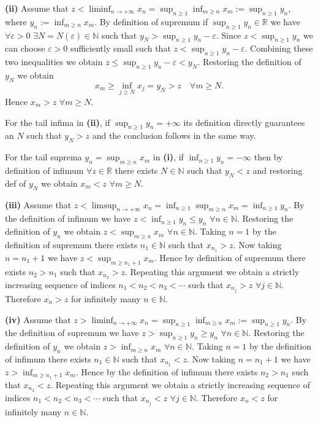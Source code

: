 \documentclass[11pt,a4paper]{article}
\newcommand{\studylabel}[1]{\textcolor{StudyBlue}{\textnormal{\bfseries #1}}}
\begin{document}
\studylabel{(ii)} Assume that $z<\liminf_{n\to+\infty}x_n=\sup_{n\ge1}\inf_{m\ge n}x_m:=\sup_{n\ge1}y_n$,
where $y_n:=\inf_{m\ge n}x_m$.
By definition of supremum if $\sup_{n\ge1}y_n\in\mathbb R$ we have $\forall\varepsilon>0$ $\exists N=N(\varepsilon)\in\mathbb N$ such that $y_N>\sup_{n\ge1}y_n-\varepsilon$.
Since $z<\sup_{n\ge1}y_n$ we can choose $\varepsilon>0$ sufficiently small such that $z<\sup_{n\ge1}y_n-\varepsilon$.
Combining these two inequalities we obtain $z\le\sup_{n\ge1}y_n-\varepsilon<y_N$.
Restoring the definition of $y_N$ we obtain
\[
x_m\ge\inf_{j\ge N}x_j=y_N>z\quad\forall m\ge N.
\]
Hence $x_m>z$ $\forall m\ge N$.

For the tail infima in \studylabel{(ii)}, if $\sup_{n\ge1}y_n=+\infty$ its definition directly guarantees an $N$ such that $y_N>z$ and the conclusion follows in the same way.

For the tail suprema $y_n=\sup_{m\ge n}x_m$ in \studylabel{(i)}, if $\inf_{n\ge1}y_n=-\infty$ then by definition of infimum $\forall z\in\mathbb R$ there exists $N\in\mathbb N$ such that $y_N<z$ and restoring def of $y_N$ we obtain $x_m<z$ $\forall m\ge N$.

\studylabel{(iii)} Assume that $z<\limsup_{n\to+\infty}x_n=\inf_{n\ge1}\sup_{m\ge n}x_m=\inf_{n\ge1}y_n$.
By the definition of infimum we have $z<\inf_{n\ge1}y_n\le y_n$ $\forall n\in\mathbb N$.
Restoring the definition of $y_n$ we obtain $z<\sup_{m\ge n}x_m$ $\forall n\in\mathbb N$.
Taking $n=1$ by the definition of supremum there exists $n_1\in\mathbb N$ such that $x_{n_1}>z$.
Now taking $n=n_1+1$ we have $z<\sup_{m\ge n_1+1}x_m$.
Hence by definition of supremum there exists $n_2>n_1$ such that $x_{n_2}>z$.
Repeating this argument we obtain a strictly increasing sequence of indices $n_1<n_2<n_3<\cdots$ such that $x_{n_j}>z$ $\forall j\in\mathbb N$.
Therefore $x_n>z$ for infinitely many $n\in\mathbb N$.

\studylabel{(iv)} Assume that $z>\liminf_{n\to+\infty}x_n=\sup_{n\ge1}\inf_{m\ge n}x_m:=\sup_{n\ge1}y_n$.
By the definition of supremum we have $z>\sup_{n\ge1}y_n\ge y_n$ $\forall n\in\mathbb N$.
Restoring the definition of $y_n$ we obtain $z>\inf_{m\ge n}x_m$ $\forall n\in\mathbb N$.
Taking $n=1$ by the definition of infimum there exists $n_1\in\mathbb N$ such that $x_{n_1}<z$.
Now taking $n=n_1+1$ we have $z>\inf_{m\ge n_1+1}x_m$.
Hence by the definition of infimum there exists $n_2>n_1$ such that $x_{n_2}<z$.
Repeating this argument we obtain a strictly increasing sequence of indices $n_1<n_2<n_3<\cdots$ such that $x_{n_j}<z$ $\forall j\in\mathbb N$.
Therefore $x_n<z$ for infinitely many $n\in\mathbb N$.
%
\end{document}
